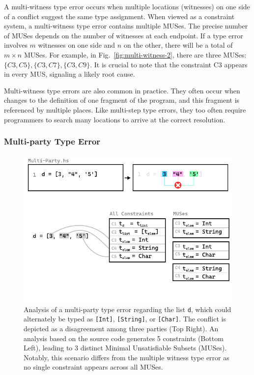 \documentclass[pdflatex,lineno,sn-nature,Numbered]{sn-jnl}%
\begin{document}
A multi-witness type error occurs when multiple locations (witnesses) on one side of a conflict suggest the same type assignment. When viewed as a constraint system, a multi-witness type error contains multiple MUSes. The precise number of MUSes depends on the number of witnesses at each endpoint. If a type error involves $m$ witnesses on one side and $n$ on the other, there will be a total of $m \times n$ MUSes. For example, in Fig.~\ref{fig:multi-witness-2}, there are three MUSes: $\{C3, C5\}, \{C3, C7\}, \{C3, C9\}$. It is crucial to note that the constraint C3 appears in every MUS, signaling a likely root cause.

Multi-witness type errors are also common in practice. They often occur when changes to the definition of one fragment of the program, and this fragment is referenced by multiple places. Like multi-step type errors, they too often require programmers to search many locations to arrive at the correct resolution.

\subsubsection*{Multi-party Type Error}

\begin{figure}[hbt]
  \centering
  \includegraphics[width=\linewidth]{images/Multi-Party-MUS}
  \caption{\label{fig:multi-party-2} Analysis of a multi-party type error regarding the list \texttt{d}, which could alternately be typed as \texttt{[Int]}, \texttt{[String]}, or \texttt{[Char]}. The conflict is depicted as a disagreement among three parties (Top Right). An analysis based on the source code generates 5 constraints (Bottom Left), leading to 3 distinct Minimal Unsatisfiable Subsets (MUSes). Notably, this scenario differs from the multiple witness type error as no single constraint appears across all MUSes.}
  \end{figure}
\end{document}
